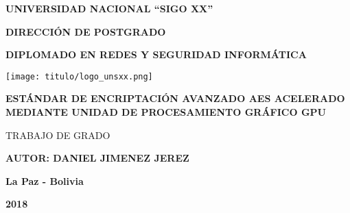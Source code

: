 \documentclass[../main.tex]{subfiles}
\begin{document}
  \thispagestyle{empty}
  \vspace*{-2cm}

  \begin{center}
    \LARGE\MakeUppercase{\textbf{Universidad Nacional ``Sigo XX''}}

    \vspace{0.2cm}
    \Large\MakeUppercase{\textbf{Dirección de Postgrado}}

    \vspace{0.2cm}
    \large\MakeUppercase{\textbf{Diplomado en Redes y Seguridad Informática}}

    \vspace{1.2cm}
    \texttt{[image: titulo/logo\_unsxx.png]}
    \vspace{1.2cm}

    \Large\MakeUppercase{\textbf{Estándar de Encriptación Avanzado AES acelerado mediante Unidad de Procesamiento Gráfico GPU}}

    \vspace{0.3cm}
    \large\MakeUppercase{Trabajo de Grado}

    \vspace{1cm}
    \large{\MakeUppercase{\textbf{Autor: Daniel Jimenez Jerez}}}
    
    \vspace{1cm}
    \large{\textbf{La Paz - Bolivia}}

    \large{\textbf{2018}}
  \end{center}
\end{document}
